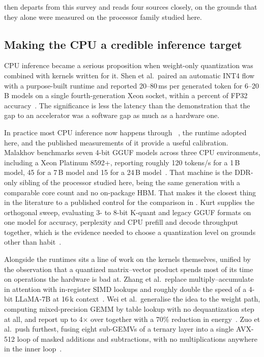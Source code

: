  then departs from this survey and reads four
sources closely, on the grounds that they alone were measured on the
processor family studied here.

\subsection{Making the CPU a credible inference target}
\label{sec:lit-arithmetic}

CPU inference became a serious proposition when weight-only quantization
was combined with kernels written for it.  Shen et al.\ paired an
automatic INT4 flow with a purpose-built runtime and reported 20--80\,ms
per generated token for 6--20\,B models on a single fourth-generation
Xeon socket, within a percent of FP32 accuracy~\cite{shen2023efficientcpu}.
The significance is less the latency than the demonstration that the
gap to an accelerator was a software gap as much as a hardware one.

In practice most CPU inference now happens through
\lcpp{}~\cite{llamacpp2026}, the runtime adopted here, and the published
measurements of it provide a useful calibration.  Malakhov benchmarks seven 4-bit GGUF
models across three CPU environments, including a Xeon Platinum 8592+,
reporting roughly 120 tokens/s for a 1\,B model, 45 for a 7\,B model and
15 for a 24\,B model~\cite{malakhov2025medlocalgpt}.  That machine is
the DDR-only sibling of the processor studied here, being the same
generation with a comparable core count and no on-package HBM.  That
makes it the closest thing in the literature to a published control for the comparison in
.  Kurt supplies the orthogonal sweep,
evaluating 3- to 8-bit K-quant and legacy GGUF formats on one model for
accuracy, perplexity and CPU prefill and decode throughput together,
which is the evidence needed to choose a quantization level on grounds
other than habit~\cite{kurt2026quantization}.

Alongside the runtimes sits a line of work on the kernels themselves,
unified by the observation that a quantized matrix--vector product
spends most of its time on operations the hardware is bad at.  Zhang et
al.\ replace multiply--accumulate in attention with in-register SIMD
lookups and roughly double the speed of a 4-bit LLaMA-7B at 16\,k
context~\cite{zhang2024nomad}.  Wei et al.\ generalise the idea to the
weight path, computing mixed-precision GEMM by table lookup with no
dequantization step at all, and report up to 4$\times$ over \lcpp{}
together with a 70\% reduction in energy~\cite{wei2025tmac}.  Zuo et
al.\ push furthest, fusing eight sub-GEMVs of a ternary layer into a
single AVX-512 loop of masked additions and subtractions, with no
multiplications anywhere in the inner
loop~\cite{zuo2026fairyfuse}.

